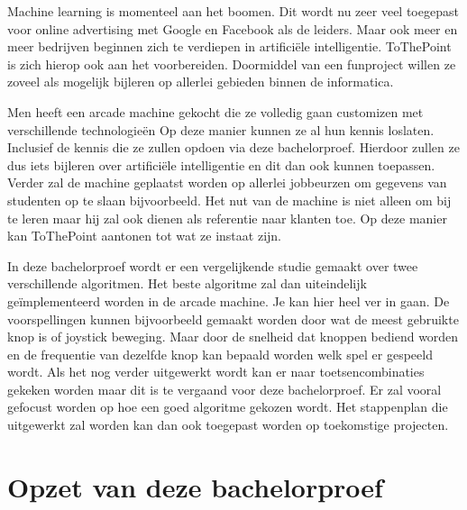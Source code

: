 
Machine learning is momenteel aan het boomen. Dit wordt nu zeer veel toegepast voor online advertising met Google en Facebook als de leiders. Maar ook meer en meer bedrijven beginnen zich te verdiepen in artificiële intelligentie. ToThePoint is zich hierop ook aan het voorbereiden. Doormiddel van een funproject willen ze zoveel als mogelijk bijleren op allerlei gebieden binnen de informatica. 

Men heeft een arcade machine gekocht die ze volledig gaan customizen met verschillende technologieën Op deze manier kunnen ze al hun kennis loslaten. Inclusief de kennis die ze zullen opdoen via deze bachelorproef. Hierdoor zullen ze dus iets bijleren over artificiële intelligentie en dit dan ook kunnen toepassen. Verder zal de machine geplaatst worden op allerlei jobbeurzen om gegevens van studenten op te slaan bijvoorbeeld. Het nut van de machine is niet alleen om bij te leren maar hij zal ook dienen als referentie naar klanten toe. Op deze manier kan ToThePoint aantonen tot wat ze instaat zijn. 

In deze bachelorproef wordt er een vergelijkende studie gemaakt over twee verschillende algoritmen. Het beste algoritme zal dan uiteindelijk geïmplementeerd worden in de arcade machine. Je kan hier heel ver in gaan. De voorspellingen kunnen bijvoorbeeld gemaakt worden door wat de meest gebruikte knop is of joystick beweging. Maar door de snelheid dat knoppen bediend worden en de frequentie van dezelfde knop kan bepaald worden welk spel er gespeeld wordt. Als het nog verder uitgewerkt wordt kan er naar toetsencombinaties gekeken worden maar dit is te vergaand voor deze bachelorproef. Er zal vooral gefocust worden op hoe een goed algoritme gekozen wordt. Het stappenplan die uitgewerkt zal worden kan dan ook toegepast worden op toekomstige projecten.



\section{Opzet van deze bachelorproef}
\label{sec:opzet-bachelorproef}


